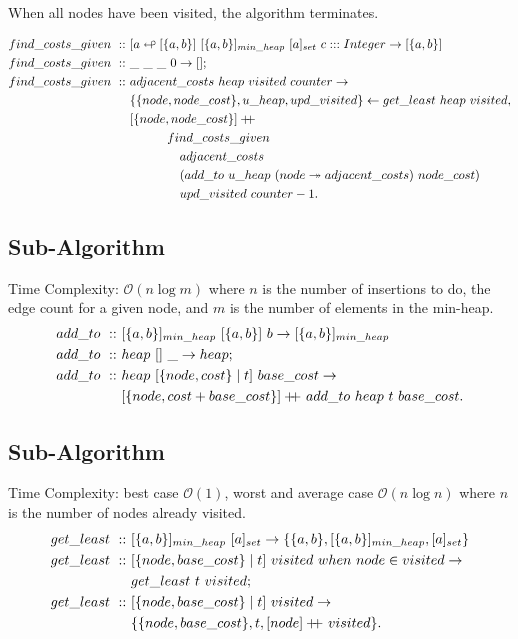 \documentclass[a4paper,10pt]{book}
\newcommand\when{\  when\ }
\newcommand\doubleplus{+\kern-1.3ex+\kern0.8ex}
\begin{document}
When all nodes have been visited, the algorithm terminates.

\begin{align*}
find\_costs\_given\ ::\ &[a\looparrowleft [\{a,b\}]\ [\{a,b\}]_{min\_heap}\ [a]_{set}\ c:::Integer\rightarrow [\{a,b\}]\\
find\_costs\_given\ ::\ &\_\ \_\ \_\ 0\rightarrow [];\\
find\_costs\_given\ ::\ &adjacent\_costs\ heap\ visited\ counter\rightarrow\\
	&\{\{node,node\_cost\},u\_heap,upd\_visited\}\leftarrow get\_least\ heap\ visited,\\
	&[\{node,node\_cost\}]\doubleplus\\ 
	&\qquad\quad find\_costs\_given\\
	&\qquad\qquad adjacent\_costs\\
	&\qquad\qquad (add\_to\ u\_heap\ (node\twoheadrightarrow adjacent\_costs)\ node\_cost)\\
	&\qquad\qquad upd\_visited\ counter-1.
\end{align*}

\subsection{Sub-Algorithm}
Time Complexity: $\mathcal{O}(n\log m)$ where $n$ is the number of insertions to do, the edge count for a given node, and $m$ is the number of elements in the min-heap.
\begin{align*}
add\_to\ ::\ &[\{a,b\}]_{min\_heap}\ [\{a,b\}]\ b\rightarrow [\{a,b\}]_{min\_heap}\\
add\_to\ ::\ &heap\ []\ \_\rightarrow heap;\\
add\_to\ ::\ &heap\ [\{node,cost\}\mid t]\ base\_cost\rightarrow\\
	&[\{node,cost+base\_cost\}]\doubleplus add\_to\ heap\ t\ base\_cost.
\end{align*}
\subsection{Sub-Algorithm}
Time Complexity: best case $\mathcal{O}(1)$, worst and average case $\mathcal{O}(n\log n)$ where $n$ is the number of nodes already visited.
\begin{align*}
get\_least\ ::\ &[\{a,b\}]_{min\_heap}\ [a]_{set}\rightarrow \{\{a,b\},[\{a,b\}]_{min\_heap},[a]_{set}\}\\
get\_least\ ::\ &[\{node,base\_cost\}\mid t]\ visited\when node\in visited\rightarrow\\
	&get\_least\ t\ visited;\\
get\_least\ ::\ &[\{node,base\_cost\}\mid t]\ visited\rightarrow\\
	&\{\{node,base\_cost\},t,[node]\doubleplus visited\}.
\end{align*}
\end{document}
